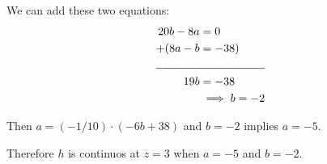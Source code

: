 \documentclass[nooutcomes]{ximera}
\renewenvironment{freeResponse}{
\ifhandout\setbox0\vbox\bgroup\else
\begin{trivlist}\item[\hskip \labelsep\bfseries Solution:\hspace{2ex}]
\fi}
{\ifhandout\egroup\else
\end{trivlist}
\fi}
\begin{document}
\begin{freeResponse}
  We can add these two equations:
  \begin{align*}
     20b - 8a &= 0 \\
   + (8a - b  &= -38)\\
     \cline{1-2}
    19b &= -38 \\
    &\implies b = -2
  \end{align*}

  Then $a = (-1/10) \cdot (-6b + 38)$ and $b = -2$ implies $a = -5$.



  
  Therefore $h$ is continuos at $z = 3$ when $a = -5$ and $b = -2$.
\end{freeResponse}
\end{document}
